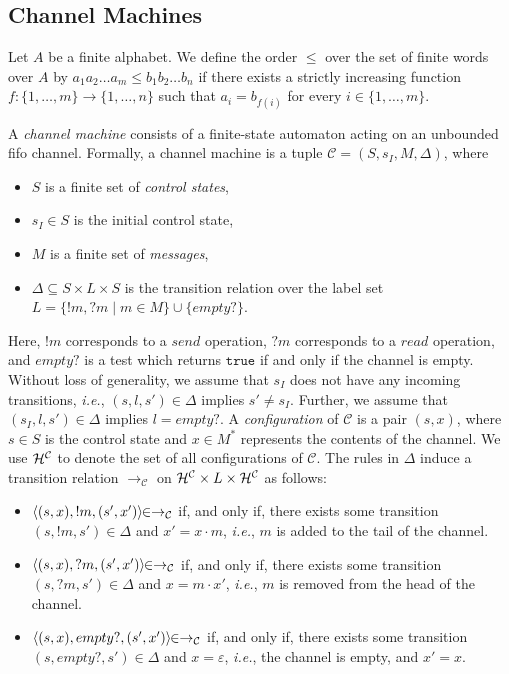 \documentclass{CSML}
\theoremstyle{plain}\newtheorem{theorem}[thm]{Theorem}
\theoremstyle{plain}\newtheorem{corollary}[thm]{Corollary}
\theoremstyle{plain}\newtheorem{example}[thm]{Example}
\theoremstyle{plain}\newtheorem{lemma}[thm]{Lemma}
\theoremstyle{plain}\newtheorem{remark}[thm]{Remark}
\newcommand{\true}{\mathtt{true}}
\newcommand*\ie{\textit{i.e.}}
\newcommand{\cm}{\mathcal{C}}
\begin{document}
	\subsection{Channel Machines}
Let $A$ be a finite alphabet. 
We define the order $\leq$ over the set of finite words over $A$ by 
$a_1 a_2 \dots a_m \leq b_1 b_2 \dots b_n$ if there exists a strictly increasing function $f:\{1,\dots,m\}\to\{1,\dots,n\}$ such that $a_i = b_{f(i)}$ for every $i\in\{1,\dots,m\}$. 

A \emph{channel machine} consists of a finite-state automaton acting on an  unbounded fifo channel. Formally, 
a channel machine is a tuple $\cm=(S,s_I,M,\Delta)$, where
\begin{itemize}
\item $S$ is a finite set of \emph{control states},
	\item $s_I\in S$ is the initial control state,
	\item $M$ is a finite set of \emph{messages},
	\item $\Delta \subseteq S\times L\times S$ is the transition relation over the label set $L=\{!m,?m\mid  m\in M\}\cup\{empty?\}$.
\end{itemize}
Here, $!m$ corresponds to a $send$ operation, $?m$ corresponds to a $read$ operation, and $empty?$ is a test which returns $\true$ if and only if the channel is empty.
Without loss of generality, we assume that $s_I$ does not have any incoming transitions, \ie, $(s,l,s')\in\Delta$ implies $s'\neq s_I$.
Further, we assume that $(s_I,l,s')\in\Delta$ implies $l=empty?$. 
A \emph{configuration} of $\cm$ is a pair $(s,x)$, where $s\in S$ is the control state and $x\in M^*$ represents the contents of the channel.
We use $\hs^\cm$ to denote the set of all configurations of $\cm$. 
The rules in $\Delta$ induce a transition relation $\to_{\cm}$ on $\hs^\cm\times L\times\hs^\cm$ as follows:
\begin{itemize}
\item $\langle (s,x),!m,(s',x')\rangle\hspace{-1.2mm}\in\to_\cm$ if, and only if, there exists some transition $(s,!m,s')\in\Delta$ and $x'=x\cdot m$, \ie, $m$ is added to the tail of the channel.
\item $\langle (s, x),?m,(s',x')\rangle\hspace{-1.2mm}\in\to_\cm$ if, and only if, there exists some transition $(s,?m,s')\in\Delta$ and $x=m\cdot x'$, \ie, $m$ is removed from the head of the channel. 
\item $\langle (s,x),empty?,(s',x')\rangle\hspace{-1.2mm}\in\to_\cm$ if, and only if, there exists some transition $(s,empty?,s')\in\Delta$ and $x=\varepsilon$, \ie, the channel is empty, and $x'=x$. 
\end{itemize}
\end{document}
